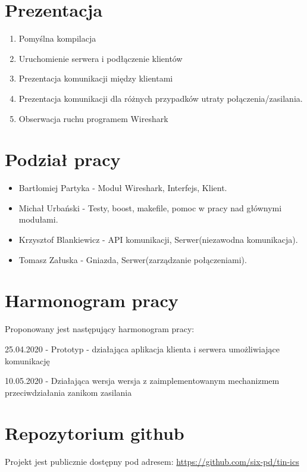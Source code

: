 \documentclass{article}
\begin{document}
\section{Prezentacja\label{prez}}

\begin{enumerate}
    \item Pomyślna kompilacja
    \item Uruchomienie serwera i podłączenie klientów
    \item Prezentacja komunikacji między klientami
    \item Prezentacja komunikacji dla różnych przypadków utraty połączenia/zasilania.
    \item Obserwacja ruchu programem Wireshark
\end{enumerate}
    

\section{Podział pracy\label{prac}}
\begin{itemize}
\item Bartłomiej Partyka - Moduł Wireshark, Interfejs, Klient.

\item Michał Urbański - Testy, boost, makefile, pomoc w pracy nad głównymi modułami.

\item Krzysztof Blankiewicz - API komunikacji, Serwer(niezawodna komunikacja).

\item Tomasz Załuska - Gniazda, Serwer(zarządzanie połączeniami). 
\end{itemize}

\section{Harmonogram pracy\label{harm}}

Proponowany jest następujący harmonogram pracy:


25.04.2020  - Prototyp - działająca aplikacja klienta i serwera umożliwiające komunikację


10.05.2020  - Działająca wersja wersja z zaimplementowanym mechanizmem przeciwdziałania zanikom zasilania

\section{Repozytorium github\label{git}}

Projekt jest publicznie dostępny pod adresem: \url{https://github.com/six-pd/tin-ics}
\end{document}
